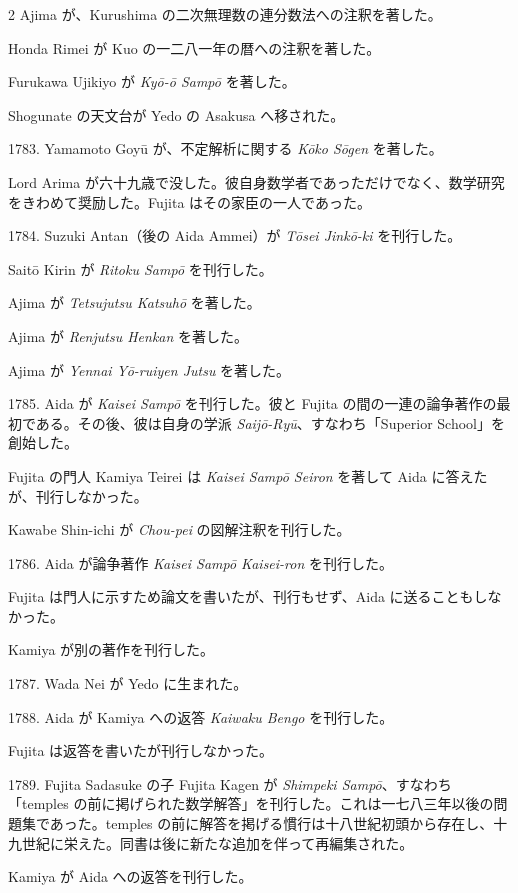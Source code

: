 \documentclass[11pt]{article}
\newcommand{\scanpage}[2]{\clearpage\setcounter{footnote}{0}\noindent{\footnotesize\color{gray}PDF #1 頁 · #2}\par\medskip}
\begin{document}
\scanpage{0199}{第23章年表、印刷頁185}
\begin{multicols}{2}\small
Ajima が、Kurushima の二次無理数の連分数法への注釈を著した。

Honda Rimei が Kuo の一二八一年の暦への注釈を著した。

Furukawa Ujikiyo が \emph{Kyō-ō Sampō} を著した。

Shogunate の天文台が Yedo の Asakusa へ移された。

1783. Yamamoto Goyū が、不定解析に関する \emph{Kōko Sōgen} を著した。

Lord Arima が六十九歳で没した。彼自身数学者であっただけでなく、数学研究をきわめて奨励した。Fujita はその家臣の一人であった。

1784. Suzuki Antan（後の Aida Ammei）が \emph{Tōsei Jinkō-ki} を刊行した。

Saitō Kirin が \emph{Ritoku Sampō} を刊行した。

Ajima が \emph{Tetsujutsu Katsuhō} を著した。

Ajima が \emph{Renjutsu Henkan} を著した。

Ajima が \emph{Yennai Yō-ruiyen Jutsu} を著した。

1785. Aida が \emph{Kaisei Sampō} を刊行した。彼と Fujita の間の一連の論争著作の最初である。その後、彼は自身の学派 \emph{Saijō-Ryū}、すなわち「Superior School」を創始した。

Fujita の門人 Kamiya Teirei は \emph{Kaisei Sampō Seiron} を著して Aida に答えたが、刊行しなかった。

Kawabe Shin-ichi が \emph{Chou-pei} の図解注釈を刊行した。

1786. Aida が論争著作 \emph{Kaisei Sampō Kaisei-ron} を刊行した。

Fujita は門人に示すため論文を書いたが、刊行もせず、Aida に送ることもしなかった。

Kamiya が別の著作を刊行した。

1787. Wada Nei が Yedo に生まれた。

1788. Aida が Kamiya への返答 \emph{Kaiwaku Bengo} を刊行した。

Fujita は返答を書いたが刊行しなかった。

1789. Fujita Sadasuke の子 Fujita Kagen が \emph{Shimpeki Sampō}、すなわち「temples の前に掲げられた数学解答」を刊行した。これは一七八三年以後の問題集であった。temples の前に解答を掲げる慣行は十八世紀初頭から存在し、十九世紀に栄えた。同書は後に新たな追加を伴って再編集された。

\columnbreak
Kamiya が Aida への返答を刊行した。


\end{multicols}
\end{document}
